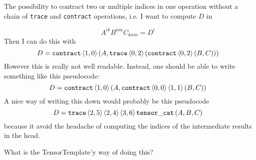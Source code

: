 \documentclass{article}
\begin{document}
The possibility to contract two or multiple
indices in one operation without a chain
of \texttt{trace} and \texttt{contract}
operations, i.e. I want to compute $D$ in

\begin{equation*}
A^{ik} B^{nm} C_{knm}
= D^i
\end{equation*}
%
Then I can do this with
%
\begin{equation*}
D=
\mathtt{contract}\braket{1,0}\left(A,
\mathtt{trace}\braket{0,2}\left(
\mathtt{contract}\braket{0,2}\left(
B,C
\right)\right)\right)
\end{equation*}
%
However this is really not well readable.
Instead, one should be able to write something
like this pseudocode:
\begin{equation*}
D = 
\mathtt{contract}\braket{1,0}\left(A,
\mathtt{contract}\braket{0,0}\braket{1,1}(B,C)
\right)
\end{equation*}
A nice way of writing this down would probably
be this pseudocode
\begin{equation*}
D=
\mathtt{trace}\braket{2,5}\braket{2,4}\braket{3,6}
\mathtt{tensor\_cat}\left(A,B,C\right)
\end{equation*}
because it avoid the headache of computing the
indices of the intermediate results in the head.

What is the TensorTemplate'y way of doing this?
\end{document}
